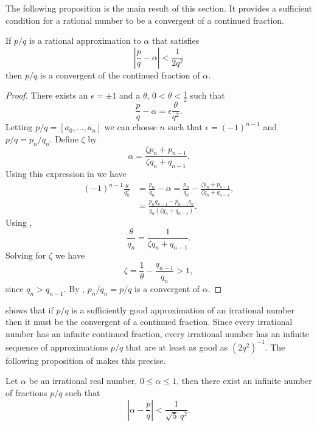 The following proposition is the main result of this section.  It
provides a sufficient condition for a rational number to be a
convergent of a continued fraction. 

\begin{proposition}\label{RationalCF:Prop}
If $p/q$ is a rational approximation to $\alpha$ that satisfies 
\[
\left| \frac{p}{q} - \alpha \right| < \frac{1}{2 q^2}
\]
then $p/q$ is a convergent of the continued fraction of $\alpha$.
\end{proposition}

\begin{proof}
There exists an $\epsilon = \pm 1$ and a $\theta$, $0 < \theta <
\frac{1}{2}$ such that
\begin{equation}\label{RationCF:Prop:Eq}
\frac{p}{q} - \alpha = \epsilon \frac{\theta}{q^2}.
\end{equation}
Letting $p/q = [a_0, \ldots, a_n]$ we can choose $n$ such that
$\epsilon = (-1)^{n-1}$ and $p/q = p_n/q_n$.  Define  $\zeta$ by 
\[
\alpha = \frac{\zeta p_n + p_{n-1}}{\zeta q_n + q_{n-1}}.
\]
Using this expression in  we have
\[
\begin{aligned}
(-1)^{n-1} \frac{\theta}{q_n^2} & = \frac{p_n}{q_n} - \alpha =
   \frac{p_n}{q_n} 
     - \frac{\zeta p_n + p_{n-1}}{\zeta q_n + q_{n-1}},\\
  & = \frac{p_n q_{n-1} - p_{n-1} q_n}{q_n (\zeta q_n + q_{n-1})}.
\end{aligned}
\]
Using ,
\[
\frac{\theta}{q_n} = \frac{1}{\zeta q_n + q_{n-1}}.
\]
Solving for $\zeta$ we have
\[
\zeta = \frac{1}{\theta} - \frac{q_{n-1}}{q_n} > 1,
\]
since $q_n > q_{n-1}$.  By , $p_n/q_n = p/q$
is a convergent of $\alpha$.
\end{proof}

 shows that if $p/q$ is a sufficiently good
approximation of an irrational number then it must be the convergent
of a continued fraction.  Since every irrational number has an infinite
continued fraction, every irrational number has an infinite sequence
of approximations $p/q$ that are at least as good as $(2q^2)^{-1}$.
The following proposition of {\Hurwitz} \cite{Hurwitz91} makes this
precise. 

\begin{proposition}[Hurwitz]
Let $\alpha$ be an irrational real number, $0 \le \alpha \le 1$, 
then there exist an infinite number of fractions $p/q$ such that
\[
\left| \alpha - \frac{p}{q} \right| < \frac{1}{\sqrt{5} \,q^2}.
\]
\end{proposition}

